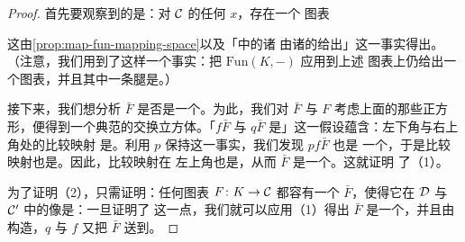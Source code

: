 \begin{proof}
首先要观察到的是：对 $\mathcal{C}$ 的任何\trObject{} $x$，存在一个%
\trHomotopyCartesian{}图表
\begin{center}
\end{center}
这由\cref{prop:map-fun-mapping-space}以及「\trPullback{}中的诸%
\trMappingSpace{}由诸\trMappingSpace{}的\trPullback{}给出」这一事实得出。
（注意，我们用到了这样一个事实：把\trFunctor{} $\mathrm{Fun}(K, -)$ 应用到上述
图表上仍给出一个\trPullback{}图表，并且其中一条腿是\trIsofibration{}。）

接下来，我们想分析 $\bar{F}$ 是否是一个\trColimit{}\trCone{}。为此，我们对
$\bar{F}$ 与 $F$ 考虑上面的那些正方形，便得到一个典范的交换立方体。「$f\bar{F}$
与 $q\bar{F}$ 是\trColimit{}\trCone{}」这一假设蕴含：左下角与右上角处的比较映射
是\trEquivalence{}。利用 $p$ 保持\trColimit{}这一事实，我们发现 $pf\bar{F}$ 也是
一个\trColimit{}\trCone{}，于是比较映射也是\trEquivalence{}。因此，比较映射在
左上角也是\trEquivalence{}，从而 $\bar{F}$ 是一个\trColimit{}\trCone{}。这就证明
了（1）。

为了证明（2），只需证明：任何图表 $F\colon K \to \mathcal{C}$ 都容有一个\trCone{}%
$\bar{F}$，使得它在 $\mathcal{D}$ 与 $\mathcal{C}'$ 中的像是\trColimit{}\trCone{}：一旦证明了
这一点，我们就可以应用（1）得出 $\bar{F}$ 是一个\trColimit{}\trCone{}，并且由
构造，$q$ 与 $f$ 又把 $\bar{F}$ 送到\trColimit{}\trCone{}。


\end{proof}
